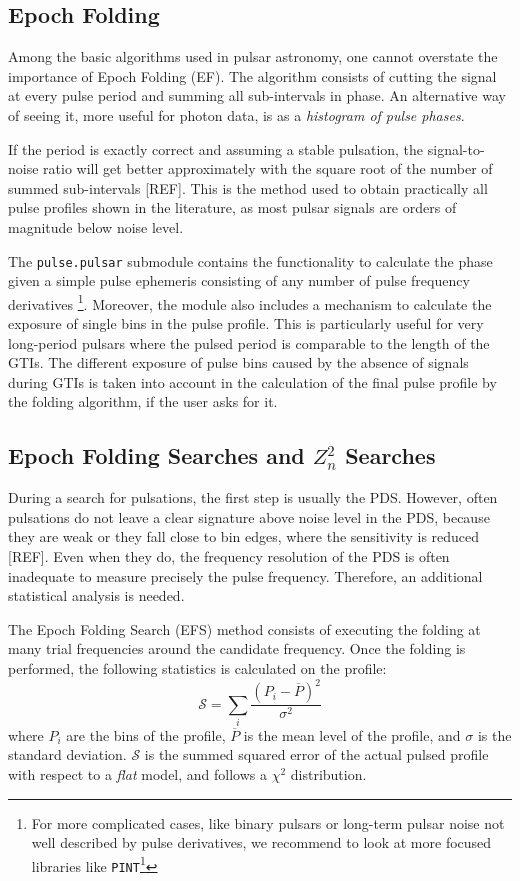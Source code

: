 \documentclass[twocolumn]{aastex62}
\newcommand{\zsq}{\ensuremath{Z^2_n}\xspace}
\begin{document}
\subsection{Epoch Folding}
Among the basic algorithms used in pulsar astronomy, one cannot overstate the importance of Epoch Folding (EF).
The algorithm consists of cutting the signal at every pulse period and summing all sub-intervals in phase. 
An alternative way of seeing it, more useful for photon data, is as a \textit {histogram of pulse phases}.

If the period is exactly correct and assuming a stable pulsation, the signal-to-noise ratio will get better approximately with the square root of the number of summed sub-intervals [REF].
This is the method used to obtain practically all pulse profiles shown in the literature, as most pulsar signals are orders of magnitude below noise level.

The \texttt{pulse.pulsar} submodule contains the functionality to calculate the phase given a simple pulse ephemeris consisting of any number of pulse frequency derivatives%
\footnote{For more complicated cases, like binary pulsars or long-term pulsar noise not well described by pulse derivatives, we recommend to look at more focused libraries like \texttt{PINT}\footnote{\url{https://github.com/nanograv/PINT}}}.
Moreover, the module also includes a mechanism to calculate the exposure of single bins in the pulse profile. 
This is particularly useful for very long-period pulsars where the pulsed period is comparable to the length of the GTIs.
The different exposure of pulse bins caused by the absence of signals during GTIs is taken into account in the calculation of the final pulse profile by the folding algorithm, if the user asks for it. 

\subsection{Epoch Folding Searches and \zsq Searches}
\label{sec:efzsq}
During a search for pulsations, the first step is usually the PDS. 
However, often pulsations do not leave a clear signature above noise level in the PDS, because they are weak or they fall close to bin edges, where the sensitivity is reduced [REF].
Even when they do, the frequency resolution of the PDS is often inadequate to measure precisely the pulse frequency.
Therefore, an additional statistical analysis is needed. 

The Epoch Folding Search (EFS) method consists of executing the folding at many trial frequencies around the candidate frequency.
Once the folding is performed, the following statistics is calculated on the profile:
\begin{equation}
\mathcal{S} = \sum_i\frac{(P_i - \overline{P})^2}{\sigma^2}
\end{equation}
where $P_i$ are the bins of the profile, $\overline{P}$ is the mean level of the profile, and $\sigma$ is the standard deviation.
$\mathcal{S}$ is the summed squared error of the actual pulsed profile with respect to a \textit{flat} model, and follows a $\chi^2$ distribution.
\end{document}
